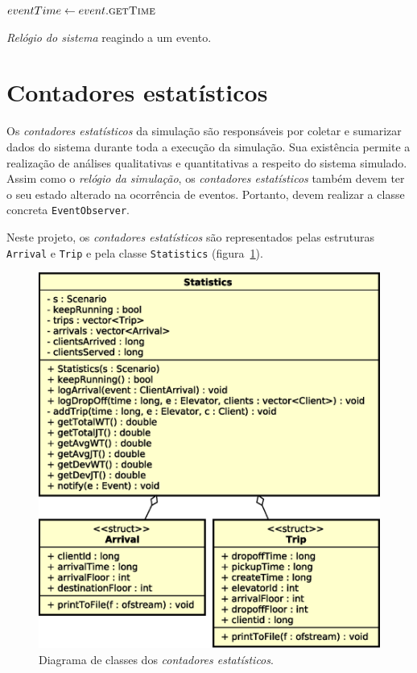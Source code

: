 \begin{algorithm}[htb]
\begin{center}
\begin{algorithmic}[1]
  \State $eventTime \leftarrow event.\Call{getTime}{}$
  \State {}
\EndFunction
\end{algorithmic}
\end{center}
\caption{\label{alg:advanceto}\textit{Relógio do sistema} reagindo a um evento.}
\end{algorithm}

\section{Contadores estatísticos}

Os \textit{contadores estatísticos} da simulação são responsáveis por coletar e
sumarizar dados do sistema durante toda a execução da simulação. Sua existência
permite a realização de análises qualitativas e quantitativas a respeito do
sistema simulado. Assim como o \textit{relógio da simulação}, os
\textit{contadores estatísticos} também devem ter o seu estado alterado na
ocorrência de eventos. Portanto, devem realizar a classe concreta
\texttt{EventObserver}.

Neste projeto, os \textit{contadores estatísticos} são
representados pelas estruturas \texttt{Arrival} e \texttt{Trip} e pela classe
\texttt{Statistics} (figura~\ref{fig:diagram:statistics}).

\begin{figure}[htb!]
  \centering
  \includegraphics[scale=0.6]{img/Statistics}
  \caption{Diagrama de classes dos \textit{contadores estatísticos}.}
\label{fig:diagram:statistics}
\end{figure}

